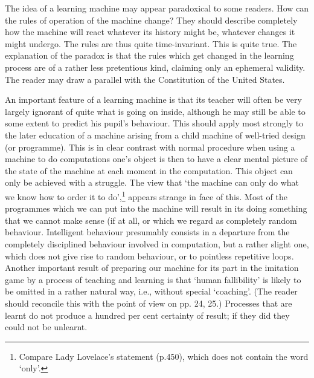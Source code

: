 \documentclass[10pt]{article} %
\begin{document}
The idea of a learning machine may appear paradoxical to some readers. How can the rules of operation of the machine change? They should describe completely how the machine will react whatever its history might be, whatever changes it might undergo. The rules are thus quite time-invariant. This is quite true. The explanation of the paradox is that the rules which get changed in the learning process are of a rather less pretentious kind, claiming only an ephemeral validity. The reader may draw a parallel with the Constitution of the United States.

An important feature of a learning machine is that its teacher will often be very largely ignorant of quite what is going on inside, although he may still be able to some extent to predict his pupil's behaviour. This should apply most strongly to the later education of a machine arising from a child machine of well-tried design (or programme). This is in clear contrast with normal procedure when using a machine to do computations one's object is then to have a clear mental picture of the state of the machine at each moment in the computation. This object can only be achieved with a struggle. The view that `the machine can only do what we know how to order it to do',\footnote{\normalfont\tiny Compare Lady Lovelace's statement (p.450), which does not contain the word `only'.} appears strange in face of this. Most of the programmes which we can put into the machine will result in its doing something that we cannot make sense (if at all, or which we regard as completely random behaviour. Intelligent behaviour presumably consists in a departure from the completely disciplined behaviour involved in computation, but a rather slight one, which does not give rise to random behaviour, or to pointless repetitive loops. Another important result of preparing our machine for its part in the imitation game by a process of teaching and learning is that `human fallibility' is likely to be omitted in a rather natural way, i.e., without special `coaching'. (The reader should reconcile this with the point of view on pp. 24, 25.) Processes that are learnt do not produce a hundred per cent certainty of result; if they did they could not be unlearnt.
\end{document}
